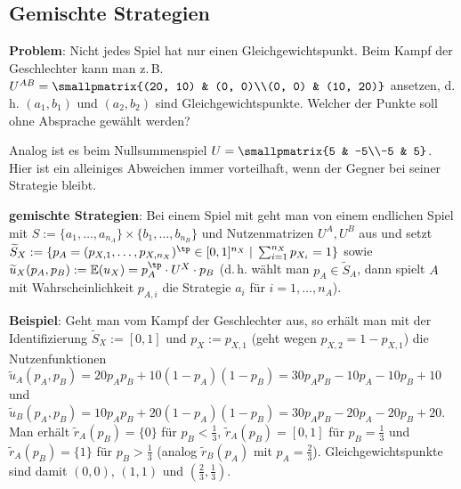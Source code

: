\subsection{%
    Gemischte Strategien%
}

\textbf{Problem}:
Nicht jedes Spiel hat nur einen Gleichgewichtspunkt.
Beim Kampf der Geschlechter kann man z.\,B.
$U^{AB} = \smallpmatrix{(20, 10) & (0, 0)\\(0, 0) & (10, 20)}$ ansetzen,
d.\,h. $(a_1, b_1)$ und $(a_2, b_2)$ sind Gleichgewichtspunkte.
Welcher der Punkte soll ohne Absprache gewählt werden?

Analog ist es beim Nullsummenspiel $U = \smallpmatrix{5 & -5\\-5 & 5}$.
Hier ist ein alleiniges Abweichen immer vorteilhaft, wenn der Gegner bei seiner Strategie bleibt.

\linie

\textbf{gemischte Strategien}:
Bei einem Spiel mit  geht man von einem endlichen Spiel mit
$S := \{a_1, \dotsc, a_{n_A}\} \times \{b_1, \dotsc, b_{n_B}\}$ und Nutzenmatrizen $U^A, U^B$
aus und setzt\\
$\widetilde{S}_X := \{p_A = (p_{X,1}, \dotsc, p_{X,n_X})^\tp \in [0, 1]^{n_X} \;|\;
\sum_{i=1}^{n_X} p_{X_i} = 1\}$ sowie\\
$\widetilde{u}_X(p_A, p_B) := \EE(u_X) = p_A^\tp \cdot U^X \cdot p_B$
(d.\,h. wählt man $p_A \in \widetilde{S}_A$, dann spielt $A$ mit Wahrscheinlichkeit $p_{A,i}$
die Strategie $a_i$ für $i = 1, \dotsc, n_A$).

\textbf{Beispiel}:
Geht man vom Kampf der Geschlechter aus, so erhält man mit der Identifizierung
$\widetilde{S}_X := [0, 1]$ und $p_X := p_{X,1}$ (geht wegen $p_{X,2} = 1 - p_{X,1}$)
die Nutzenfunktionen\\
$\widetilde{u}_A(p_A, p_B) = 20 p_A p_B + 10 (1 - p_A) (1 - p_B)
= 30 p_A p_B - 10 p_A - 10 p_B + 10$ und\\
$\widetilde{u}_B(p_A, p_B) = 10 p_A p_B + 20 (1 - p_A) (1 - p_B)
= 30 p_A p_B - 20 p_A - 20 p_B + 20$.\\
Man erhält
$\widetilde{r}_A(p_B) = \{0\}$ für $p_B < \frac{1}{3}$,
$\widetilde{r}_A(p_B) = [0, 1]$ für $p_B = \frac{1}{3}$ und
$\widetilde{r}_A(p_B) = \{1\}$ für $p_B > \frac{1}{3}$
(analog $\widetilde{r}_B(p_A)$ mit $p_A = \frac{2}{3}$).
Gleichgewichtspunkte sind damit $(0, 0)$, $(1, 1)$ und $(\frac{2}{3}, \frac{1}{3})$.

\pagebreak
